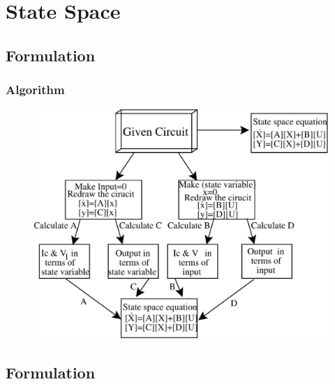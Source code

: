 \documentclass{beamer}
\begin{document}


\section{State Space}
\subsection*{Formulation}

\begin{frame}
\frametitle{Algorithm}

\begin{small}
\begin{figure}
	\begin{center}
	
        \includegraphics[scale=0.4,angle=360]{./images/flow}
        \label{flowA}
	\end{center}
	\end{figure}

\end{small}
\end{frame}


\subsection*{Formulation}
\end{document}
